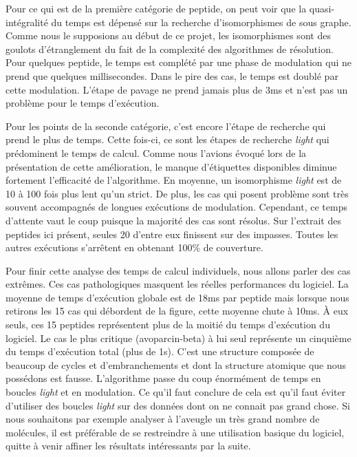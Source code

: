 Pour ce qui est de la première catégorie de peptide, on peut voir que la quasi-intégralité du temps est dépensé sur la recherche d'isomorphismes de sous graphe.
Comme nous le supposions au début de ce projet, les isomorphismes sont des goulots d'étranglement du fait de la complexité des algorithmes de résolution.
Pour quelques peptide, le temps est complété par une phase de modulation qui ne prend que quelques millisecondes.
Dans le pire des cas, le temps est doublé par cette modulation.
L'étape de pavage ne prend jamais plus de 3ms et n'est pas un problème pour le temps d'exécution.

Pour les points de la seconde catégorie, c'est encore l'étape de recherche qui prend le plus de temps.
Cette fois-ci, ce sont les étapes de recherche \textit{light} qui prédominent le temps de calcul.
Comme nous l'avions évoqué lors de la présentation de cette amélioration, le manque d'étiquettes disponibles diminue fortement l'efficacité de l'algorithme.
En moyenne, un isomorphisme \textit{light} est de 10 à 100 fois plus lent qu'un strict.
De plus, les cas qui posent problème sont très souvent accompagnés de longues exécutions de modulation.
Cependant, ce temps d'attente vaut le coup puisque la majorité des cas sont résolus.
Sur l'extrait des peptides ici présent, seules 20 d'entre eux finissent sur des impasses.
Toutes les autres exécutions s'arrêtent en obtenant 100\% de couverture.

Pour finir cette analyse des temps de calcul individuels, nous allons parler des cas extrêmes.
Ces cas pathologiques masquent les réelles performances du logiciel.
La moyenne de temps d'exécution globale est de 18ms par peptide mais lorsque nous retirons les 15 cas qui débordent de la figure, cette moyenne chute à 10ms.
À eux seuls, ces 15 peptides représentent plus de la moitié du temps d'exécution du logiciel.
Le cas le plus critique (avoparcin-beta) à lui seul représente un cinquième du temps d'exécution total (plus de 1s).
C'est une structure composée de beaucoup de cycles et d'embranchements et dont la structure atomique que nous possédons est fausse.
L'algorithme passe du coup énormément de temps en boucles \textit{light} et en modulation.
Ce qu'il faut conclure de cela est qu'il faut éviter d'utiliser des boucles \textit{light} sur des données dont on ne connait pas grand chose.
Si nous souhaitons par exemple analyser à l'aveugle un très grand nombre de molécules, il est préférable de se restreindre à une utilisation basique du logiciel, quitte à venir affiner les résultats intéressants par la suite.








